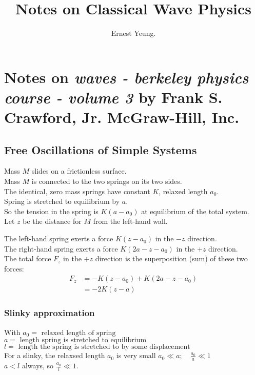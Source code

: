\documentclass[twoside, 10pt]{amsart}
\begin{document}
	\title{	Notes on Classical Wave Physics }		
		\author{ Ernest Yeung.	}%
		\maketitle


\section{ Notes on \emph{waves - berkeley physics course - volume 3 } by Frank S. Crawford, Jr.  McGraw-Hill, Inc. }

\subsection{ Free Oscillations of Simple Systems }

Mass $M$ slides on a frictionless surface.  \\
Mass $M$ is connected to the two springs on its two sides.  \\
\quad The identical, zero mass springs have constant $K$, relaxed length $a_0$.  \\
Spring is stretched to equilibrium by $a$.  \\
\quad So the tension in the spring is $K(a-a_0)$ at equilibrium of the total system.  \\
Let $z$ be the distance for $M$ from the left-hand wall.  

The left-hand spring exerts a force $K(z-a_0)$ in the $-z$ direction.  \\
The right-hand spring exerts a force $K(2a-z-a_0)$ in the $+z$ direction.  \\
The total force $F_z$ in the $+z$ direction is the superposition (sum) of these two forces:
\[
\begin{aligned}
  F_z & = -K(z-a_0) + K(2a-z-a_0) \\
  & = -2K(z-a)
\end{aligned}
\]

\subsubsection*{ Slinky approximation }

With $a_0 = \text{ relaxed length of spring }$ \\
\phantom{With} $a = \text{ length spring is stretched to equilibrium } $ \\
\phantom{With} $l = \text{ length the spring is stretched to by some displacement } $ \\ 
For a slinky, the relaxsed length $a_0$ is very small $a_0 \ll a; \quad \frac{a_0}{a} \ll 1$ \\
\quad $a < l$ always, so $\frac{a_0}{l} \ll 1$.  
\end{document}
